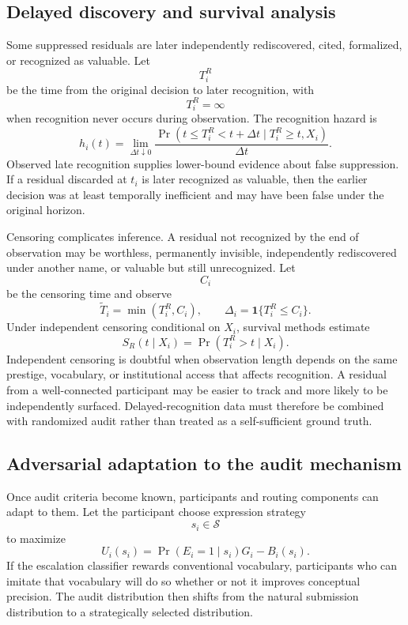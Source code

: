 \documentclass[11pt]{article}
\theoremstyle{definition}
\DeclareMathOperator{\Prob}{Pr}
\newcommand{\ind}{\mathbf{1}}
\begin{document}
\subsection{Delayed discovery and survival analysis}

Some suppressed residuals are later independently rediscovered, cited, formalized, or recognized as valuable. Let
\[
T_i^{R}
\]
be the time from the original decision to later recognition, with
\[
T_i^{R}=\infty
\]
when recognition never occurs during observation. The recognition hazard is
\[
h_i(t)
=
\lim_{\Delta t\downarrow0}
\frac{
\Prob(
t\leq T_i^{R}<t+\Delta t
\mid
T_i^{R}\geq t,
X_i
)
}{
\Delta t
}.
\]
Observed late recognition supplies lower-bound evidence about false suppression. If a residual discarded at \(t_i\) is later recognized as valuable, then the earlier decision was at least temporally inefficient and may have been false under the original horizon.

Censoring complicates inference. A residual not recognized by the end of observation may be worthless, permanently invisible, independently rediscovered under another name, or valuable but still unrecognized. Let
\[
C_i
\]
be the censoring time and observe
\[
\widetilde T_i
=
\min(T_i^{R},C_i),
\qquad
\Delta_i
=
\ind\{T_i^{R}\leq C_i\}.
\]
Under independent censoring conditional on \(X_i\), survival methods estimate
\[
S_R(t\mid X_i)
=
\Prob(T_i^{R}>t\mid X_i).
\]
Independent censoring is doubtful when observation length depends on the same prestige, vocabulary, or institutional access that affects recognition. A residual from a well-connected participant may be easier to track and more likely to be independently surfaced. Delayed-recognition data must therefore be combined with randomized audit rather than treated as a self-sufficient ground truth.

\subsection{Adversarial adaptation to the audit mechanism}

Once audit criteria become known, participants and routing components can adapt to them. Let the participant choose expression strategy
\[
s_i\in\mathcal{S}
\]
to maximize
\[
U_i(s_i)
=
\Prob(E_i=1\mid s_i)G_i
-
B_i(s_i).
\]
If the escalation classifier rewards conventional vocabulary, participants who can imitate that vocabulary will do so whether or not it improves conceptual precision. The audit distribution then shifts from the natural submission distribution to a strategically selected distribution.
\end{document}
